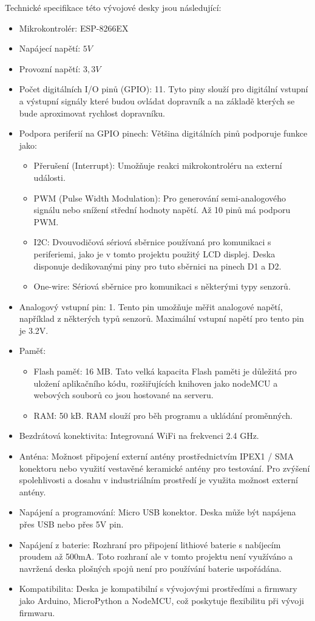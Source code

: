 Technické specifikace této vývojové desky jsou následující: \cite{ESP8266EXDatasheet, D1MiniProDokumentace}
\begin{itemize}
	\item Mikrokontrolér: ESP-8266EX
	\item Napájecí napětí: $5V$
	\item Provozní napětí: $3,3V$
	\item Počet digitálních I/O pinů (GPIO): 11. Tyto piny slouží pro digitální vstupní a výstupní signály které budou ovládat dopravník a na základě kterých se bude aproximovat rychlost dopravníku.
	\item Podpora periferií na GPIO pinech: Většina digitálních pinů podporuje funkce jako:
	\begin{itemize}
		\item Přerušení (Interrupt): Umožňuje reakci mikrokontroléru na externí události.
		\item PWM (Pulse Width Modulation): Pro generování semi-analogového signálu nebo snížení střední hodnoty napětí. Až 10 pinů má podporu PWM.
		\item I2C: Dvouvodičová sériová sběrnice používaná pro komunikaci s periferiemi, jako je v tomto projektu použitý LCD displej. Deska disponuje dedikovanými piny pro tuto sběrnici na pinech D1 a D2.
		\item One-wire: Sériová sběrnice pro komunikaci s některými typy senzorů.
	\end{itemize}
	\item Analogový vstupní pin: 1. Tento pin umožňuje měřit analogové napětí, například z některých typů senzorů. Maximální vstupní napětí pro tento pin je 3.2V.
	\item Paměť:
	\begin{itemize}
		\item Flash paměť: 16 MB. Tato velká kapacita Flash paměti je důležitá pro uložení aplikačního kódu, rozšiřujících knihoven jako nodeMCU a webových souborů co jsou hostované na serveru.
		\item RAM: 50 kB. RAM slouží pro běh programu a ukládání proměnných.
	\end{itemize}
	\item Bezdrátová konektivita: Integrovaná WiFi na frekvenci 2.4 GHz.
	\item Anténa: Možnost připojení externí antény prostřednictvím IPEX1 / SMA konektoru nebo využití vestavěné keramické antény pro testování. Pro zvýšení spolehlivosti a dosahu v industriálním prostředí je využita možnost externí antény.
	\item Napájení a programování: Micro USB konektor. Deska může být napájena přes USB nebo přes 5V pin.
	\item Napájení z baterie: Rozhraní pro připojení lithiové baterie s nabíjecím proudem až 500mA. Toto rozhraní ale v tomto projektu není využíváno a navržená deska plošných spojů není pro používání baterie uspořádána.
	\item Kompatibilita: Deska je kompatibilní s vývojovými prostředími a firmwary jako Arduino, MicroPython a NodeMCU, což poskytuje flexibilitu při vývoji firmwaru.
\end{itemize}


